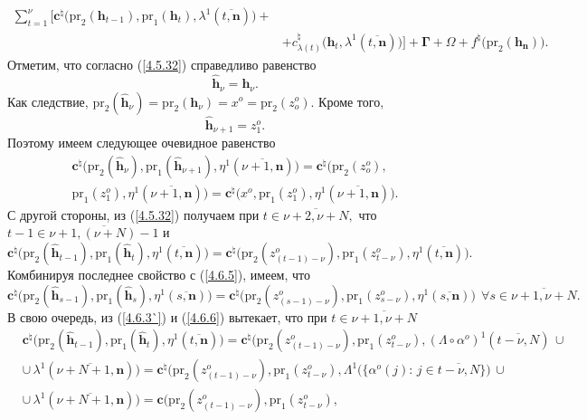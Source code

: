\documentclass[12pt]{report}
\newcommand{\bfn}{\begin{equation}}
\newcommand{\efn}{\end{equation}}
\newcommand{\ov}{\overline}
\newcommand{\La}{\Lambda}
\newcommand{\la}{\lambda}
\newcommand{\al}{\alpha}
\newcommand{\fa}{\forall}
\newcommand{\zc}{{\mathbf c}}
\newcommand{\nn}{{\mathbf n}}
\begin{document}
{{\begin{eqnarray}
\sum\limits_{t=1}^\nu \bigl[\zc^\natural\bigl(\mathrm{pr}_2(\mathbf{h}_{t-1}),\mathrm{pr}_1(\mathbf{h}_t),
\la^1(\ov{t,\nn})\bigl) +
&\nonumber\\
&+c_{\la(t)}^\natural\bigl(\mathbf{h}_t,\la^1(\ov{t,\nn})\bigl)\bigl] +\mathbf{\Gamma} +
\Omega + f^\natural\bigl(\mathrm{pr}_2(\mathbf{h}_\nn)\bigl).
&\label{4.6.5``}
\end{eqnarray}
Отметим, что согласно (\ref{4.5.32}) справедливо равенство
$$
\hat{\mathbf{h}}_\nu = \mathbf{h}_\nu.
$$
Как следствие, $\mathrm{pr}_2(\hat{\mathbf{h}}_\nu) = \mathrm{pr}_2(\mathbf{h}_\nu) = x^o = \mathrm{pr}_2(z_o^o).$ Кроме того,
$$
\hat{\mathbf{h}}_{\nu+1} = z_1^o.
$$
Поэтому имеем следующее очевидное равенство
\begin{eqnarray}
&\zc^\natural\bigl(\mathrm{pr}_2(\hat{\mathbf{h}}_\nu),\mathrm{pr}_1
(\hat{\mathbf{h}}_{\nu+1}),\eta^1(\ov{\nu+1,\nn})\bigl)= \zc^\natural\bigl(\mathrm{pr}_2(z_o^o),
&\nonumber\\
&\mathrm{pr}_1 (z_1^o),\eta^1(\ov{\nu+1,\nn})\bigl)= \zc^\natural\bigl(x^o,\mathrm{pr}_1(z_1^o),
\eta^1(\ov{\nu+1,\nn})\bigl).
&\label{4.6.5}
\end{eqnarray}
С другой стороны, из (\ref{4.5.32}) получаем  при $t\in\ov{\nu+2,\nu+N},$ что $t-1 \in \ov{\nu+1,(\nu+N)- 1}$ и
$$
\zc^\natural\bigl(\mathrm{pr}_2(\hat{\mathbf{h}}_{t-1}),\mathrm{pr}_1(\hat{\mathbf{h}}_t),
\eta^1(\ov{t,\nn})\bigl) = \zc^\natural\bigl(\mathrm{pr}_2(z_{(t-1)-\nu}^o),\mathrm{pr}_1(z_{t-\nu}^o),
\eta^1(\ov{t,\nn})\bigl).
$$
Комбинируя последнее свойство с (\ref{4.6.5}), имеем, что
\bfn\label{4.6.6}
\zc^\natural\bigl(\mathrm{pr}_2(\hat{\mathbf{h}}_{s-1}),\mathrm{pr}_1
(\hat{\mathbf{h}}_s), \eta^1(\ov{s,\nn})\bigl)=
\zc^\natural\bigl(\mathrm{pr}_2(z_{(s-1)-\nu}^o),\mathrm{pr}_1(z_{s-\nu}^o),
\eta^1(\ov{s,\nn})\bigl)\ \ \fa s\in \ov{\nu+1,\nu+N}.
\efn
В свою очередь, из (\ref{4.6.3`}) и (\ref{4.6.6}) вытекает, что при $t\in\ov{\nu+1,\nu+N}$
\begin{eqnarray}
&\zc^\natural\bigl(\mathrm{pr}_2(\hat{\mathbf{h}}_{t-1}),\mathrm{pr}_1
(\hat{\mathbf{h}}_t), \eta^1(\ov{t,\nn})\bigl)=
\zc^\natural\bigl(\mathrm{pr}_2(z_{(t-1)-\nu}^o),\mathrm{pr}_1(z_{t-\nu}^o),
(\La \circ \al^o)^1(\ov{t-\nu,N})\,\cup
&\nonumber\\
&\cup\,\la^1(\ov{\nu+N+1,\nn})\bigl)=
\zc^\natural\bigl(\mathrm{pr}_2(z_{(t-1)-\nu}^o),\mathrm{pr}_1(z_{t-\nu}^o),
\La^1\bigl(\{\al^o(j):\,j\in\ov{t-\nu,N}\})\,\cup
&\nonumber\\
&\cup\,\la^1(\ov{\nu+N+1,\nn})\bigl)=
\zc\bigl(\mathrm{pr}_2(z_{(t-1)-\nu}^o),\mathrm{pr}_1(z_{t-\nu}^o),

\end{eqnarray}}}
\end{document}
